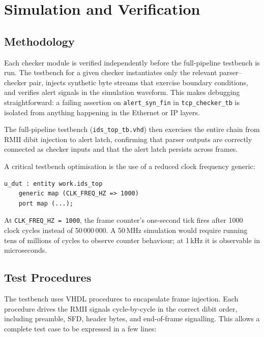 \documentclass[12pt, a4paper]{report}
\begin{document}
\chapter{Simulation and Verification}
\label{ch:simulation}

\section{Methodology}

Each checker module is verified independently before the full-pipeline testbench is run. The testbench for a given checker instantiates only the relevant parser--checker pair, injects synthetic byte streams that exercise boundary conditions, and verifies alert signals in the simulation waveform. This makes debugging straightforward: a failing assertion on \texttt{alert\_syn\_fin} in \texttt{tcp\_checker\_tb} is isolated from anything happening in the Ethernet or IP layers.

The full-pipeline testbench (\texttt{ids\_top\_tb.vhd}) then exercises the entire chain from RMII dibit injection to alert latch, confirming that parser outputs are correctly connected as checker inputs and that the alert latch persists across frames.

A critical testbench optimisation is the use of a reduced clock frequency generic:

\begin{lstlisting}[caption={Generic override in the testbench}, label=lst:generic]
u_dut : entity work.ids_top
    generic map (CLK_FREQ_HZ => 1000)
    port map (...);
\end{lstlisting}

At \texttt{CLK\_FREQ\_HZ = 1000}, the frame counter's one-second tick fires after 1000 clock cycles instead of 50\,000\,000. A 50\,MHz simulation would require running tens of millions of cycles to observe counter behaviour; at 1\,kHz it is observable in microseconds.

\section{Test Procedures}

The testbench uses VHDL procedures to encapsulate frame injection. Each procedure drives the RMII signals cycle-by-cycle in the correct dibit order, including preamble, SFD, header bytes, and end-of-frame signalling. This allows a complete test case to be expressed in a few lines:
\end{document}
